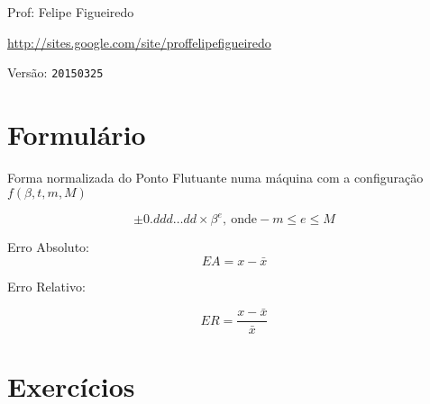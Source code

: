 \documentclass[a4paper]{article}
\begin{document}
\parbox[c]{.825\textwidth}{\raggedright%
{Prof: Felipe Figueiredo\par}
{\url{http://sites.google.com/site/proffelipefigueiredo}\par}
}

Versão: \verb|20150325|



\section{Formulário}

Forma normalizada do Ponto Flutuante numa máquina com a configuração $f(\beta,t,m,M)$

\begin{displaymath}
  \pm 0.ddd \ldots dd \times \beta ^e  \mathrm {,\ onde } -m \le e \le M
\end{displaymath}


Erro Absoluto:
\begin{displaymath}
  EA = x - \bar{x}
\end{displaymath}

Erro Relativo:

\begin{displaymath}
  ER = \frac{x-\bar{x}}{\bar{x}}
\end{displaymath}
\section{Exercícios}
\end{document}
